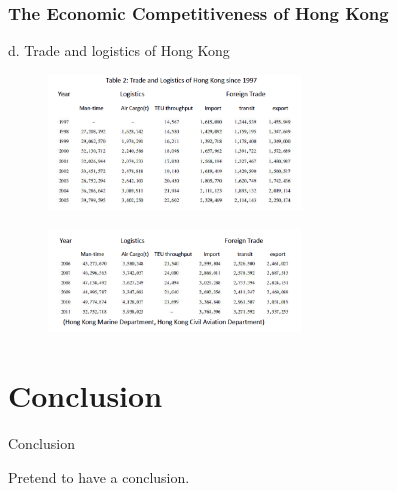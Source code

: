 \documentclass[slidestop,uncompress,mathsans, 12pt]{beamer}
\begin{document}
\begin{frame}
\frametitle{The Economic Competitiveness of Hong Kong}
d.  Trade and logistics of Hong Kong\\
\begin{figure}[h]
\includegraphics[width=0.6\textwidth]{hk13.png}
\label{threadsVsSync}
\end{figure}
\begin{figure}[h]
\includegraphics[width=0.6\textwidth]{hk14.png}
\label{threadsVsSync}
\end{figure}
\end{frame}
\section{Conclusion}
\begin{frame}{Conclusion}

\bigskip
\bigskip

\begin{block}{}
Pretend to have a conclusion.
\end{block}
\end{frame}
\begin{frame}
\bigskip
\bigskip
\bigskip
\bigskip
\bigskip
\bigskip
\bigskip
\bigskip

\\ 
\end{frame}
\end{document}
